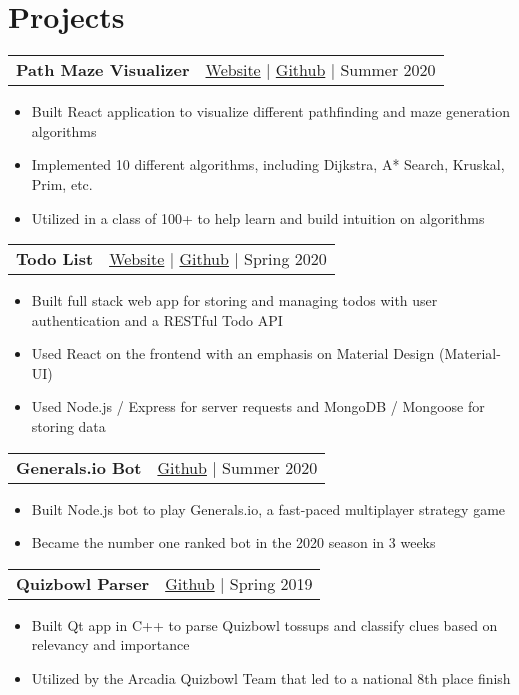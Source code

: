 \documentclass{article}
\begin{document}
\section*{Projects}
\begin{tabularx}{\textwidth}{L R}
  \textbf{Path Maze Visualizer} & \href{https://seanye24.github.io/pathmaze-visualizer}{Website} | \href{https://github.com/seanye24/pathmaze-visualizer}{Github} | Summer 2020 
\end{tabularx}
\begin{itemize}
  \setlength{\itemsep}{-2pt}
  \item Built React application to visualize different pathfinding and maze generation algorithms
  \item Implemented 10 different algorithms, including Dijkstra, A* Search, Kruskal, Prim, etc.
  \item Utilized in a class of 100+ to help learn and build intuition on algorithms
\end{itemize}
\begin{tabularx}{\textwidth}{L R}
  \textbf{Todo List} & \href{https://minimaltodolist.herokuapp.com}{Website} | \href{https://github.com/seanye24/todo}{Github} | Spring 2020
\end{tabularx}
\begin{itemize}
  \setlength{\itemsep}{-2pt}
  \item Built full stack web app for storing and managing todos with user authentication and a RESTful Todo API
  \item Used React on the frontend with an emphasis on Material Design (Material-UI)
  \item Used Node.js / Express for server requests and MongoDB / Mongoose for storing data
\end{itemize}
\begin{tabularx}{\textwidth}{L R}
  \textbf{Generals.io Bot} & \href{https://github.com/seanye24/generalsio-bot}{Github} | Summer 2020
\end{tabularx}
\begin{itemize}
  \setlength{\itemsep}{-2pt}
  \item Built Node.js bot to play Generals.io, a fast-paced multiplayer strategy game
  \item Became the number one ranked bot in the 2020 season in 3 weeks
\end{itemize}
\begin{tabularx}{\textwidth}{L R}
  \textbf{Quizbowl Parser} & \href{https://github.com/seanye24/quizbowl-parser}{Github} | Spring 2019
\end{tabularx}
\begin{itemize}
  \setlength{\itemsep}{-2pt}
  \item Built Qt app in C++ to parse Quizbowl tossups and classify clues based on relevancy and importance
  \item Utilized by the Arcadia Quizbowl Team that led to a national 8th place finish
\end{itemize}
\end{document}
